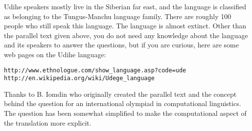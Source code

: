 \documentclass[11pt]{article}
\begin{document}
\begin{exe}
\begin{xlist}
{\begin{soln}
\end{soln}
}

\end{xlist}

Udihe speakers mostly live in the Siberian far east, 
and the language is classified as belonging to the Tungus-Manchu language
family. There are roughly 100 people who still speak this language. The language
is almost extinct. Other than the parallel text given above, you do not need any knowledge about the language
and its speakers to answer the questions, but if you are curious, here are
some web pages on the Udihe language:

{\small
\begin{verbatim}
http://www.ethnologue.com/show_language.asp?code=ude
http://en.wikipedia.org/wiki/Udege_language
\end{verbatim}
}

\begin{comment}
{\bf Hint}
\bigskip

All the expressions above denote something (call it ${\cal Y}$) belonging to someone
or something else (call it ${\cal X}$). In English, the predicate of possession
$\textsf{Possess}({\cal X}, {\cal Y})$
would be denoted by the phrase {\it the ${\cal Y}$ of the ${\cal X}$} / {\it the ${\cal X}$'s ${\cal Y}$}, 
e.g. {\it the stool's leg} 
or {\it the boy's money}. How is this predicate expressed
in Udihe? 

\bigskip

In English, we can use the expression ${\cal X}$'s ${\cal Y}$ 
if the predicate indicates that ${\cal Y}$ is a part of ${\cal X}$, 
e.g. {\it the stool's leg}, or if the predicate indicates that ${\cal Y}$ is separate from 
and belongs to ${\cal X}$, e.g. {\it the boy's money}. How are these two predicates
expressed in Udihe? 

\bigskip

Things get a bit more interesting when we add in another component and we have
two possession predicates. Depending on how they interact, we can observe
different cases: for instance,  
${\cal X}$ ${\cal Y}$'s ${\cal Z}$, e.g. {\it \fbox{thy son}'s shoulder}  or
${\cal X}$'s ${\cal Y}$ ${\cal Z}$, e.g. {\it my \fbox{boar head}}.

\bigskip
\bigskip
\end{comment}

{\small
Thanks to B. Iomdin who originally created the parallel text and the concept
behind the question for an international olympiad in computational linguistics.
The question has been somewhat simplified to make the computational aspect of
the translation more explicit.
}


\end{exe}
\end{document}
